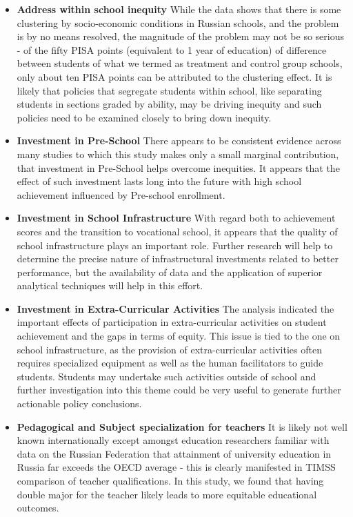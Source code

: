 \documentclass[alpha-refs,fleqn]{wiley-article_p2}
\begin{document}
\begin{itemize}
\begin{itemize}

\item \textbf{Address within school inequity} While the data shows that there is some clustering by socio-economic conditions in Russian schools, and the problem is by no means resolved, the magnitude of the problem may not be so serious - of the fifty PISA points (equivalent to 1 year of education) of difference between students of what we termed as treatment and control group schools, only about ten PISA points can be attributed to the clustering effect. It is likely that policies that segregate students within school, like separating students in sections graded by ability, may be driving inequity and such policies need to be examined closely to bring down inequity.

\item \textbf{Investment in Pre-School} There appears to be consistent evidence across many studies to which this study makes only a small marginal contribution, that investment in Pre-School helps overcome inequities. It appears that the effect of such investment lasts long into the future with high school achievement influenced by Pre-school enrollment. 

\item \textbf{Investment in School Infrastructure} With regard both to achievement scores and the transition to vocational school, it appears that the quality of school infrastructure plays an important role. Further research will help to determine the precise nature of infrastructural investments related to better performance, but the availability of data and the application of superior analytical techniques will help in this effort.


\item \textbf{Investment in Extra-Curricular Activities} The analysis indicated the important effects of participation in extra-curricular activities on student achievement and the gaps in terms of equity. This issue is tied to the one on school infrastructure, as the provision of extra-curricular activities often requires specialized equipment as well as the human facilitators to guide students. Students may undertake such activities outside of school and further investigation into this theme could be very useful to generate further actionable policy conclusions.

\item \textbf{Pedagogical and Subject specialization for teachers} It is likely not well known internationally except amongst education researchers familiar with data on the Russian Federation that attainment of university education in Russia far exceeds the OECD average - this is clearly manifested in TIMSS comparison of teacher qualifications. In this study, we found that having double major for the teacher likely leads to more equitable educational outcomes. 


\end{itemize}
\end{itemize}
\end{document}
